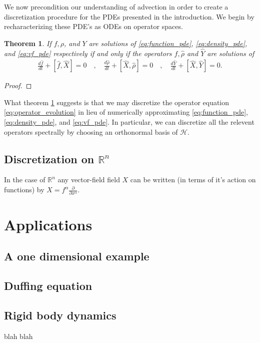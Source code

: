 \documentclass[12pt]{amsart}
\newcommand{\pder}[2]{\ensuremath{\frac{ \partial #1}{\partial #2}}}
\newcommand{\R}{\ensuremath{\mathbb{R}}}
\newtheorem{thm}{Theorem}[section]
\begin{document}
We now precondition our understanding of advection in order to create 
a discretization procedure for the PDEs presented in the introduction.
We begin by recharacterizing these PDE's as ODEs on operator spaces.
\begin{thm}\label{thm:operator}
	If $f,\rho$, and $Y$ are solutions of \eqref{eq:function_pde}, \eqref{eq:density_pde}, and \eqref{eq:vf_pde} respectively
	if and only if the operators $\hat{f},\hat{\rho}$ and $\hat{Y}$ are solutions of
	\begin{align} \label{eq:operator_evolution}
		\frac{d\hat{f}}{dt} + [ \hat{f} , \widehat{X} ] = 0 \quad,\quad
		\frac{d\hat{\rho}}{dt} + [ \widehat{X} , \hat{\rho} ] = 0 \quad,\quad
		\frac{d\widehat{Y}}{dt} + [ \widehat{X} , \widehat{Y} ] = 0.
	\end{align}
\end{thm}
\begin{proof}
\end{proof}
What theorem \ref{thm:operator} suggests is that we may discretize the operator equation \eqref{eq:operator_evolution} in lieu of numerically approximating  \eqref{eq:function_pde}, \eqref{eq:density_pde}, and \eqref{eq:vf_pde}.
In particular, we can discretize all the relevent operators spectrally by choosing an orthonormal basis of $\mathcal{H}$.

\subsection{Discretization on $\R^n$}
\label{eq:flat manifolds}
In the case of $\mathbb{R}^n$ any vector-field field $X$ can be written (in terms of it's action on functions) by
$X = f^\alpha \pder{}{x^\alpha}$.


\section{Applications}

\subsection{A one dimensional example}

\subsection{Duffing equation}

\subsection{Rigid body dynamics}
blah blah
\end{document}
